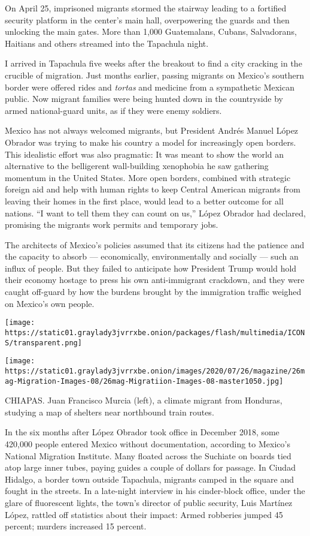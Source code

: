 On April 25, imprisoned migrants stormed the stairway leading to a
fortified security platform in the center's main hall, overpowering the
guards and then unlocking the main gates. More than 1,000 Guatemalans,
Cubans, Salvadorans, Haitians and others streamed into the Tapachula
night.

I arrived in Tapachula five weeks after the breakout to find a city
cracking in the crucible of migration. Just months earlier, passing
migrants on Mexico's southern border were offered rides and
\emph{tortas} and medicine from a sympathetic Mexican public. Now
migrant families were being hunted down in the countryside by armed
national-guard units, as if they were enemy soldiers.

Mexico has not always welcomed migrants, but President Andrés Manuel
López Obrador was trying to make his country a model for increasingly
open borders. This idealistic effort was also pragmatic: It was meant to
show the world an alternative to the belligerent wall-building
xenophobia he saw gathering momentum in the United States. More open
borders, combined with strategic foreign aid and help with human rights
to keep Central American migrants from leaving their homes in the first
place, would lead to a better outcome for all nations. ``I want to tell
them they can count on us,'' López Obrador had declared, promising the
migrants work permits and temporary jobs.

The architects of Mexico's policies assumed that its citizens had the
patience and the capacity to absorb --- economically, environmentally
and socially --- such an influx of people. But they failed to anticipate
how President Trump would hold their economy hostage to press his own
anti-immigrant crackdown, and they were caught off-guard by how the
burdens brought by the immigration traffic weighed on Mexico's own
people.

\texttt{[image: https://static01.graylady3jvrrxbe.onion/packages/flash/multimedia/ICONS/transparent.png]}

\texttt{[image: https://static01.graylady3jvrrxbe.onion/images/2020/07/26/magazine/26mag-Migration-Images-08/26mag-Migratiion-Images-08-master1050.jpg]}

CHIAPAS. Juan Francisco Murcia (left), a climate migrant from Honduras,
studying a map of shelters near northbound train routes.

In the six months after López Obrador took office in December 2018, some
420,000 people entered Mexico without documentation, according to
Mexico's National Migration Institute. Many floated across the Suchiate
on boards tied atop large inner tubes, paying guides a couple of dollars
for passage. In Ciudad Hidalgo, a border town outside Tapachula,
migrants camped in the square and fought in the streets. In a late-night
interview in his cinder-block office, under the glare of fluorescent
lights, the town's director of public security, Luis Martínez López,
rattled off statistics about their impact: Armed robberies jumped 45
percent; murders increased 15 percent.

